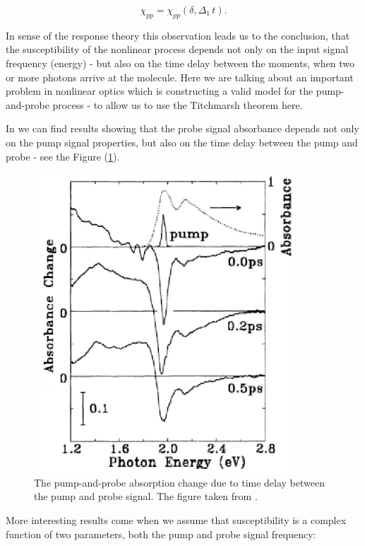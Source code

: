 \documentclass[12pt,twoside,a4paper]{article}
\numberwithin{equation}{subsection}
\numberwithin{figure}{subsection}
\begin{document}
\begin{equation} \label{eq:physical_pnp_susceptibility}
  \chi_{pp} = \chi_{pp} (\delta , \Delta_1 \, t).
\end{equation} 

In sense of the response theory this observation leads us to the conclusion, that the susceptibility of the nonlinear process depends not
only on the input signal frequency (energy) - but also on the time delay between the moments, when two or more photons arrive at
the molecule. Here we are talking about an important problem in nonlinear optics which is constructing a valid model for the pump-and-probe
process - to allow us to use the Titchmarsh theorem here. 

In \cite{christodoulides_nonlinear} we can find results showing that the probe signal absorbance depends not only on the pump
signal properties, but also on the time delay between the pump and probe - see the Figure (\ref{physical_fig:pnp_absorption}).

\begin{figure} 
	\begin{center}
		\includegraphics{img/pnp_abs.png}
		\caption{The pump-and-probe absorption change due to time delay between the pump and probe signal. The figure taken from
		\cite{christodoulides_nonlinear}. \label{physical_fig:pnp_absorption} }
	\end{center}
\end{figure}


More interesting results come when we assume that susceptibility is a complex function of two parameters, both the pump and
probe signal frequency:
\end{document}
